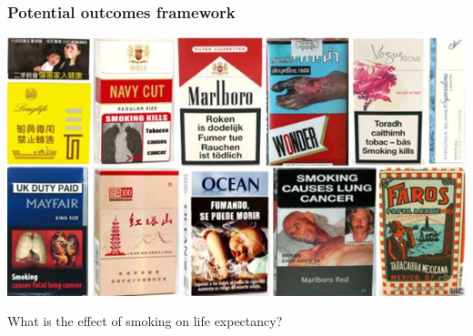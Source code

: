 \documentclass[aspectratio=43]{beamer}
\begin{document}
\begin{frame}
\frametitle{Potential outcomes framework}
\centering

\includegraphics[width = 1\textwidth]{../img/tabaco}

\vspace{10pt}

What is the effect of smoking on life expectancy?

\end{frame}
\end{document}
